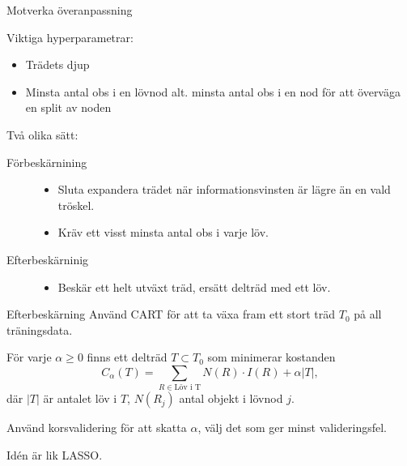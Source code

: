 \documentclass[10pt,english]{beamer}
\begin{document}
\begin{frame}{Motverka överanpassning}

    Viktiga hyperparametrar:
    \begin{itemize}
      \item Trädets djup
      \item Minsta antal obs i en lövnod alt. minsta antal obs i en nod för att överväga en split av noden
    \end{itemize}

    Två olika sätt:
    \begin{description}
        \item[Förbeskärnining]
        \begin{itemize}
            \item Sluta expandera trädet när informationsvinsten är lägre än en vald tröskel.
            \item Kräv ett visst minsta antal obs i varje löv.
        \end{itemize}
        \item[Efterbeskärninig]
        \begin{itemize}
            \item Beskär ett helt utväxt träd, ersätt delträd med ett löv.
        \end{itemize}
    \end{description}
    
\end{frame}

\begin{frame}{Efterbeskärning}
    Använd CART för att ta växa fram ett stort träd $T_0$ på all träningsdata.

    För varje $\alpha \geq 0$ finns ett delträd $T \subset T_0$ som minimerar kostanden
    \begin{equation*}
        C_{\alpha}(T) = \sum_{R \in \text{Löv i T}} N(R) \cdot I(R) + \alpha |T|,
    \end{equation*} 
    där $|T|$ är antalet löv i $T$, $N(R_j)$ antal objekt i lövnod $j$.

    Använd korsvalidering för att skatta $\alpha$, välj det som ger minst valideringsfel.

    Idén är lik LASSO.
\end{frame}
\end{document}
